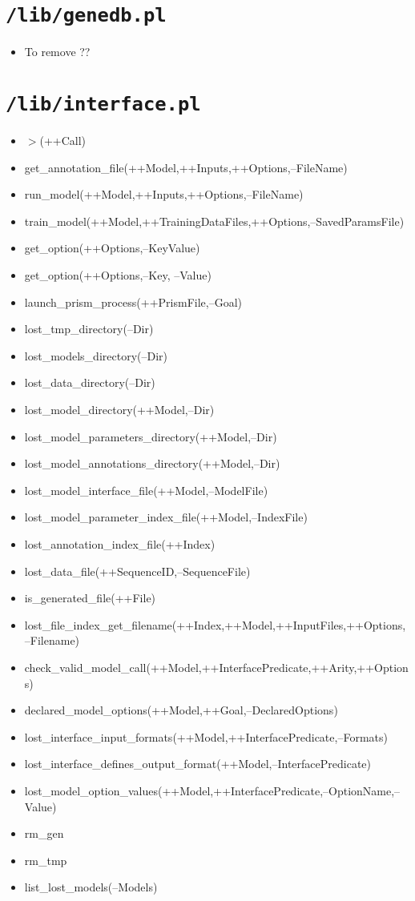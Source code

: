 \section{\texttt{/lib/genedb.pl}}
%
\begin{itemize}
\item To remove ??
\end{itemize}

\section{\texttt{/lib/interface.pl}}
%
\begin{itemize}
\item $>$(++Call)
\item get\_annotation\_file(++Model,++Inputs,++Options,--FileName)
\item run\_model(++Model,++Inputs,++Options,--FileName)
\item train\_model(++Model,++TrainingDataFiles,++Options,--SavedParamsFile)
\item get\_option(++Options,--KeyValue)
\item get\_option(++Options,--Key, --Value)
\item launch\_prism\_process(++PrismFile,--Goal)
\item lost\_tmp\_directory(--Dir)
\item lost\_models\_directory(--Dir)
\item lost\_data\_directory(--Dir)
\item lost\_model\_directory(++Model,--Dir)
\item lost\_model\_parameters\_directory(++Model,--Dir)
\item lost\_model\_annotations\_directory(++Model,--Dir) %
\item lost\_model\_interface\_file(++Model,--ModelFile)
\item lost\_model\_parameter\_index\_file(++Model,--IndexFile)
\item lost\_annotation\_index\_file(++Index)
\item lost\_data\_file(++SequenceID,--SequenceFile)
\item is\_generated\_file(++File)
\item lost\_file\_index\_get\_filename(++Index,++Model,++InputFiles,++Options,--Filename)
\item check\_valid\_model\_call(++Model,++InterfacePredicate,++Arity,++Options)
\item declared\_model\_options(++Model,++Goal,--DeclaredOptions)
\item lost\_interface\_input\_formats(++Model,++InterfacePredicate,--Formats)
\item lost\_interface\_defines\_output\_format(++Model,--InterfacePredicate)
\item lost\_model\_option\_values(++Model,++InterfacePredicate,--OptionName,--Value)  
\item rm\_gen
\item rm\_tmp
\item list\_lost\_models(--Models) 
\end{itemize}

